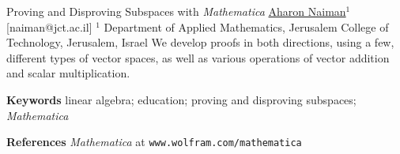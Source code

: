 \begin{abstract_online}{Proving and Disproving Subspaces with \emph{Mathematica}}{%
        \underline{Aharon Naiman}$^{1}$}{[naiman@jct.ac.il]
        }{%
        $^1$ Department of Applied Mathematics, Jerusalem College of
    Technology, Jerusalem, Israel}
We develop proofs in both directions, using a few, different types of
vector spaces, as well as various operations of vector addition and
scalar multiplication.

\textbf{Keywords} \newline{} linear algebra; education; proving and
disproving subspaces; \emph{Mathematica}

\textbf{References} \newline{}
\emph{Mathematica} at \texttt{www.wolfram.com/mathematica} \newline{}
\end{abstract_online}
    
